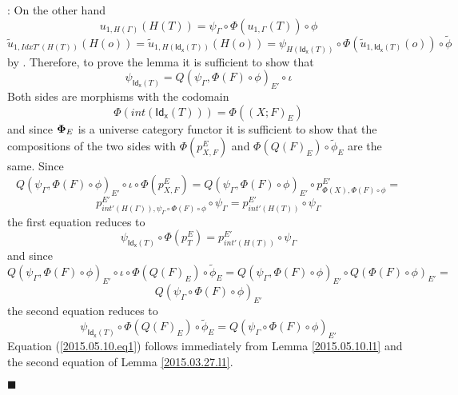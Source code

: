 \documentclass[12pt]{article}
\numberwithin{equation}{section}
\newenvironment{eq}{\begin{equation}}{\end{equation}}
\newenvironment{myproof}{{\bf Proof}:}{$\blacksquare$ \vskip 5mm }
\newcommand{\llabel}[1]{\label{#1}}
\newcommand{\wt}{\widetilde}
\newcommand{\Idx}{\mathsf{Id_x}} %
\begin{document}
\begin{myproof}
On the other hand
%
$$u_{1,H(\Gamma)}(H(T))=\psi_{\Gamma}\circ \Phi(u_{1,\Gamma}(T))\circ \phi$$
$$\wt{u}_{1,IdxT'(H(T))}(H(o))=\wt{u}_{1,H(\Idx(T))}(H(o))=\psi_{H(\Idx(T))}\circ
\Phi(\wt{u}_{1,\Idx(T)}(o))\circ \wt{\phi}$$
%
by \cite[Lemma 6.1(1,2)]{fromunivwithPi}. Therefore, to prove the lemma it is
sufficient to show that
%
$$\psi_{\Idx(T)}=Q(\psi_{\Gamma},\Phi(F)\circ\phi)_{E'}\circ\iota$$
%
Both sides are morphisms with the codomain
%
$$\Phi(int(\Idx(T)))=\Phi((X;F)_E)$$
%
and since ${\bf\Phi}_E$ is a universe category functor it is sufficient to show
that the compositions of the two sides with $\Phi(p^E_{X,F})$ and
$\Phi(Q(F)_E)\circ \wt{\phi}_E$ are the same. Since
%
$$Q(\psi_{\Gamma},\Phi(F)\circ\phi)_{E'}\circ\iota\circ
\Phi(p^E_{X,F})=Q(\psi_{\Gamma},\Phi(F)\circ\phi)_{E'}\circ
p^{E'}_{\Phi(X),\Phi(F)\circ\phi}=$$
$$p^{E'}_{int'(H(\Gamma)),\psi_{\Gamma}\circ
  \Phi(F)\circ\phi}\circ\psi_{\Gamma}=p^{E'}_{int'(H(T))}\circ\psi_{\Gamma}$$
%
the first equation reduces to
%
\begin{eq}
\llabel{2015.05.10.eq1} \psi_{\Idx(T)}\circ
\Phi(p^E_{T})=p^{E'}_{int'(H(T))}\circ\psi_{\Gamma}
\end{eq}
%
and since
%
$$Q(\psi_{\Gamma},\Phi(F)\circ\phi)_{E'}\circ\iota\circ \Phi(Q(F)_E)\circ
\wt{\phi}_E=Q(\psi_{\Gamma},\Phi(F)\circ\phi)_{E'}\circ
Q(\Phi(F)\circ\phi)_{E'}=$$$$Q(\psi_{\Gamma}\circ \Phi(F)\circ \phi)_{E'}$$
%
the second equation reduces to
%
\begin{eq}
\llabel{2015.05.10.eq2.0} \psi_{\Idx(T)}\circ \Phi(Q(F)_E)\circ
\wt{\phi}_E=Q(\psi_{\Gamma}\circ \Phi(F)\circ \phi)_{E'}
\end{eq}
%
Equation (\ref{2015.05.10.eq1}) follows immediately from Lemma
\ref{2015.05.10.l1} and the second equation of Lemma \ref{2015.03.27.l1}.


\end{myproof}
\end{document}
